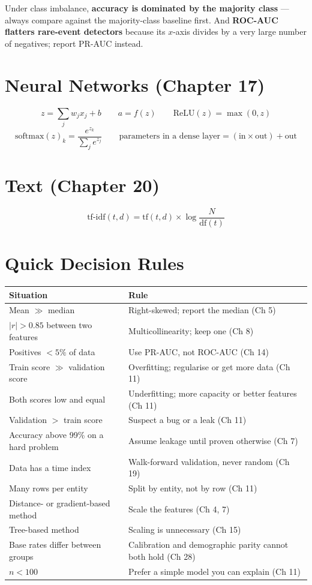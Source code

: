\begin{alertbox}
Under class imbalance, \textbf{accuracy is dominated by the majority class} ---
always compare against the majority-class baseline first. And \textbf{ROC-AUC
flatters rare-event detectors} because its $x$-axis divides by a very large number
of negatives; report PR-AUC instead.
\end{alertbox}

\section{Neural Networks (Chapter 17)}

\[
z = \sum_j w_j x_j + b
\qquad
a = f(z)
\qquad
\text{ReLU}(z)=\max(0,z)
\]
\[
\text{softmax}(z)_k = \frac{e^{z_k}}{\sum_j e^{z_j}}
\qquad
\text{parameters in a dense layer} = (\text{in}\times\text{out}) + \text{out}
\]

\section{Text (Chapter 20)}

\[
\text{tf-idf}(t,d) = \text{tf}(t,d)\times\log\frac{N}{\text{df}(t)}
\]

\section{Quick Decision Rules}

\begin{longtable}{@{}L{6.0cm}L{8.0cm}@{}}
\toprule
{}
\textbf{Situation} & \textbf{Rule} \\
\midrule
\endhead
Mean $\gg$ median & Right-skewed; report the median (Ch 5) \\
$|r| > 0.85$ between two features & Multicollinearity; keep one (Ch 8) \\
Positives $< 5\%$ of data & Use PR-AUC, not ROC-AUC (Ch 14) \\
Train score $\gg$ validation score & Overfitting; regularise or get more data (Ch 11) \\
Both scores low and equal & Underfitting; more capacity or better features (Ch 11) \\
Validation $>$ train score & Suspect a bug or a leak (Ch 11) \\
Accuracy above 99\% on a hard problem & Assume leakage until proven otherwise (Ch 7) \\
Data has a time index & Walk-forward validation, never random (Ch 19) \\
Many rows per entity & Split by entity, not by row (Ch 11) \\
Distance- or gradient-based method & Scale the features (Ch 4, 7) \\
Tree-based method & Scaling is unnecessary (Ch 15) \\
Base rates differ between groups & Calibration and demographic parity cannot both hold (Ch 28) \\
$n < 100$ & Prefer a simple model you can explain (Ch 11) \\
\bottomrule
\end{longtable}
